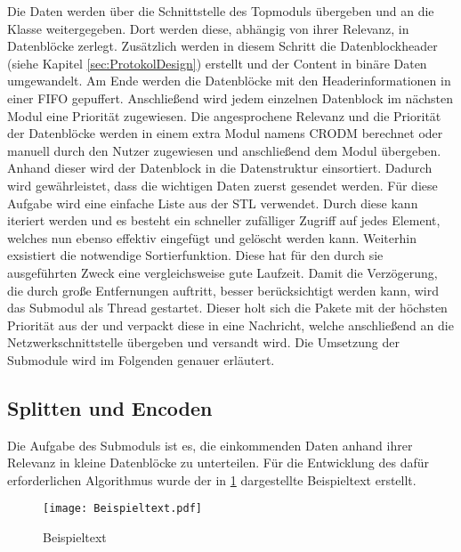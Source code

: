 Die Daten werden {\"u}ber die Schnittstelle des Topmoduls 
{\"u}bergeben und an die Klasse  weitergegeben. Dort
werden diese, abh{\"a}ngig von ihrer Relevanz, in Datenbl{\"o}cke zerlegt.
Zus{\"a}tzlich werden in diesem Schritt die Datenblockheader (siehe Kapitel
\ref{sec:ProtokolDesign}) erstellt und der Content in bin{\"a}re Daten
umgewandelt. Am Ende werden die Datenbl{\"o}cke mit den Headerinformationen in
einer \gls{FIFO} gepuffert.
Anschließend wird jedem einzelnen Datenblock im n{\"a}chsten Modul eine
Priorit{\"a}t zugewiesen. Die angesprochene Relevanz und die Priorit{\"a}t der
Datenbl{\"o}cke werden in einem extra Modul namens \gls{CRODM} berechnet oder
manuell durch den Nutzer zugewiesen und anschließend dem Modul 
{\"u}bergeben.
Anhand dieser wird der Datenblock in die Datenstruktur
 einsortiert. Dadurch wird gew{\"a}hrleistet, dass
die wichtigen Daten zuerst gesendet werden. F{\"u}r diese Aufgabe wird eine
einfache Liste aus der \gls{STL} verwendet. Durch diese kann iteriert werden und
es besteht ein schneller zufälliger Zugriff auf jedes Element, welches nun
ebenso effektiv eingefügt und gelöscht werden kann.
Weiterhin exsistiert die notwendige Sortierfunktion. Diese hat f{\"u}r den durch sie
ausgef{\"u}hrten Zweck eine vergleichsweise gute Laufzeit.
Damit die Verz{\"o}gerung, die durch gro{\ss}e Entfernungen auftritt, besser
ber{\"u}cksichtigt werden kann, wird das Submodul  als Thread
gestartet.
Dieser holt sich die Pakete mit der h{\"o}chsten Priorit{\"a}t aus der
 und verpackt diese in eine Nachricht, welche
anschlie{\ss}end an die Netzwerkschnittstelle {\"u}bergeben und versandt wird.
\newline Die Umsetzung der Submodule wird im Folgenden genauer
erl{\"a}utert.

\subsection{Splitten und Encoden}

Die Aufgabe des Submoduls  ist es, die einkommenden Daten
anhand ihrer Relevanz in kleine Datenbl{\"o}cke zu unterteilen. F{\"u}r die Entwicklung
des daf{\"u}r erforderlichen Algorithmus wurde der in \ref{fig:Beispieltext}
dargestellte Beispieltext erstellt.

\begin{figure}[H]
	\centering
	\texttt{[image: Beispieltext.pdf]}
	\caption{Beispieltext}
	\label{fig:Beispieltext}
\end{figure}

